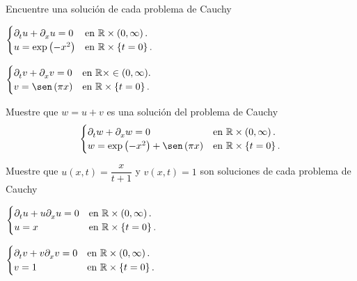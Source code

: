 \question

Encuentre una solución de cada problema de Cauchy
\begin{multicols}{2}
	\begin{math}
		\begin{cases}
			\difcp{u}{t}+
			\difcp{u}{x}=
			0                       &
			\text{en }\mathbb{R}\times\left(0,\infty\right). \\
			u=
			\exp\left(-x^{2}\right) &
			\text{en }\mathbb{R}\times\left\{t=0\right\}.
		\end{cases}
	\end{math}

	\begin{math}
		\begin{cases}
			\difcp{v}{t}+
			\difcp{v}{x}=
			0                      &
			\text{en }\mathbb{R}\times\in(0,\infty). \\
			v=
			\sen\left(\pi x\right) &
			\text{en }\mathbb{R}\times\left\{t=0\right\}.
		\end{cases}
	\end{math}
\end{multicols}

Muestre que $w=u+v$ es una solución del problema de Cauchy
\begin{equation*}
	\begin{cases}
		\difcp{w}{t}+
		\difcp{w}{x}=
		0                      &
		\text{en }\mathbb{R}\times\left(0,\infty\right). \\
		w=
		\exp\left(-x^{2}\right)+
		\sen\left(\pi x\right) &
		\text{en }\mathbb{R}\times\left\{t=0\right\}.
	\end{cases}
\end{equation*}

\question

Muestre que
\begin{math}
	u\left(x,t\right)=
	\dfrac{x}{t+1}
\end{math}
y
\begin{math}
	v\left(x,t\right)=
	1
\end{math}
son soluciones de cada problema de Cauchy
\begin{multicols}{2}
	\begin{math}
		\begin{cases}
			\difcp{u}{t}+
			u
			\difcp{u}{x}=
			0 &
			\text{en }\mathbb{R}\times\left(0,\infty\right). \\
			u=
			x &
			\text{en }\mathbb{R}\times\left\{t=0\right\}.
		\end{cases}
	\end{math}

	\begin{math}
		\begin{cases}
			\difcp{v}{t}+
			v
			\difcp{v}{x}=0 &
			\text{en }\mathbb{R}\times\left(0,\infty\right). \\
			v=
			1              &
			\text{en }\mathbb{R}\times\left\{t=0\right\}.
		\end{cases}
	\end{math}
\end{multicols}

